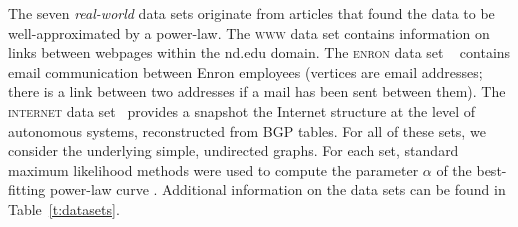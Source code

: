 The seven \emph{real-world} data sets originate  from articles that found the data to be well-approximated by a power-law. 
The \textsc{www} data set  \cite{albert1999internet} contains information on links between webpages within the nd.edu domain. 
The \textsc{enron} data set ~\cite{leskovec2009community}  contains email communication between  Enron employees (vertices are email addresses; there is a link between two addresses
if a mail has been sent between them).
The \textsc{internet} data set~\cite{newman} provides a snapshot the Internet structure at the level of  autonomous systems, reconstructed from BGP tables. 
For all of these sets, we consider the underlying simple, undirected graphs. For each set, standard maximum likelihood methods were used to compute the parameter
$\alpha$ of the best-fitting power-law curve \cite{clauset2009power}. Additional information on the data sets can be found in Table~\ref{t:datasets}.

